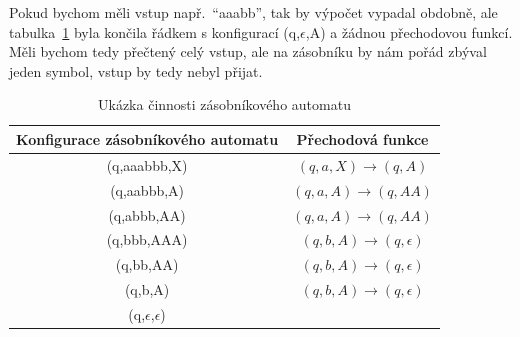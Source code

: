 Pokud bychom měli vstup např.\ ``aaabb'', tak by výpočet vypadal obdobně, ale tabulka~\ref{tab:DemonstationOfPDA} byla končila řádkem s konfigurací (q,$\epsilon$,A) a žádnou přechodovou funkcí. Měli bychom tedy přečtený celý vstup, ale na zásobníku by nám pořád zbýval jeden symbol, vstup by tedy nebyl přijat.

\begin{table}[h]
    \centering
    \begin{tabular}{c|c}
        Konfigurace zásobníkového automatu & Přechodová funkce \\
        \hline
        (q,aaabbb,X) & $(q,a,X) \rightarrow (q,A)$ \\
        (q,aabbb,A) & $(q,a,A) \rightarrow (q,AA)$ \\
        (q,abbb,AA) & $(q,a,A) \rightarrow (q,AA)$ \\
        (q,bbb,AAA) & $(q,b,A) \rightarrow (q,\epsilon)$ \\
        (q,bb,AA) & $(q,b,A) \rightarrow (q,\epsilon)$ \\
        (q,b,A) & $(q,b,A) \rightarrow (q,\epsilon)$ \\
        (q,$\epsilon$,$\epsilon$) &  \\
    \end{tabular}
    \caption{Ukázka činnosti zásobníkového automatu }\label{tab:DemonstationOfPDA}
\end{table}

\endinput